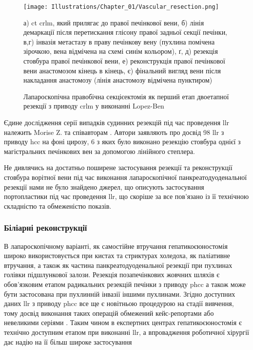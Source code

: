 \begin{figure}[!ht]
\caption{Лапароскопічна правобічна секцієектомія як перший етап двоетапної резекції з приводу \acrshort{crlm} у виконанні Lopez-Ben \cite{Lopez-Ben2020}}

\texttt{[image: Illustrations/Chapter\_01/Vascular\_resection.png]}
\label{fig:Vascular_resection}

\medskip
\small
а) \acrshort{ct} \acrshort{crlm}, який прилягає до правої печінкової вени, б) лінія демаркації після перетискання глісону правої задньої секції печінки, в,г) інвазія метастазу в праву печінкову вену (пухлина помічена зірочкою, вена відмічена на схемі синім кольором), ґ, д) резекція стовбура правої печінкової вени, е) реконструкція правої печінкової вени анастомозом кінець в кінець, є) фінальний вигляд вени після накладання анастомозу (лінія анастомозу відмічена пунктиром)

\end{figure}
	
Єдине дослідження серії випадків судинних резекцій під час проведення \acrshort{llr} належить Morise Z. та співавторам \cite{Morise2015a}. Автори заявляють про досвід 98 \acrshort{llr} з приводу \acrshort{hcc} на фоні цирозу, 6 з яких було виконано резекцію стовбура однієї з магістральних печінкових вен за допомогою лінійного степлера.

Не дивлячись на достатньо поширене застосування резекції та реконструкції стовбура ворітної вени під час виконання лапароскопічної панкреатодуоденальної резекції \cite{Kendrick2011, Garbarino2018, Wei2019} нами не було знайдено джерел, що описують застосування портопластики під час проведення \acrshort{llr}, що скоріше за все пов'язано із її технічною складністю та обмеженістю показів. 

\subsubsection{Біліарні реконструкції}

В лапароскопічному варіанті, як самостійне втручання гепатикоєюностомія широко використовується при кистах та стриктурах холедоха, як паліативне втручання, а також як частина панкреатодуоденальної резекції при пухлинах голівки підшлункової залози. Резекція позапечінкових жовчних шляхів є обов'язковим етапом радикальних резекцій печінки з приводу \acrshort{phcc} а також може бути застосована при пухлинній інвазії іншими пухлинами. Згідно доступних даних \acrshort{llr} з приводу  \acrshort{phcc} все ще є новітньою процедурою на стадії вивчення, тому досвід виконання таких операцій обмежений кейс-репортами \cite{Lin2014, Machado2014} або невеликими серіями \cite{Ratti2020}. Таким чином в експертних центрах гепатикоєюностомія є технічно доступним етапом при виконанні \acrshort{llr}, а впровадження роботичної хірургії дає надію на її більш широке застосування \cite{Machado2019, Giulianotti2010}

